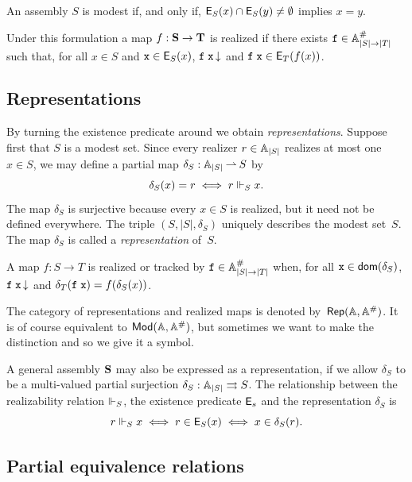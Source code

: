 An assembly $S$ is modest if, and only if, $\mathsf{E}_S(x) \cap \mathsf{E}_S(y)
\neq \emptyset$ implies $x = y$.

Under this formulation a map $f : \mathbf{S} \to \mathbf{T}$ is realized if
there exists $\mathtt{f} \in \mathbb{A}^{\#}_{|S| \to |T|}$ such that, for all $x
\in S$ and $\mathtt{x} \in \mathsf{E}_S(x)$, $\mathtt{f}\;\mathtt{x}\,{\downarrow}$ and
$\mathtt{f}\;\mathtt{x} \in \mathsf{E}_T(f(x))$.

\subsection{Representations}
\label{sec:representations}

By turning the existence predicate around we obtain
\emph{representations}. Suppose first that $S$ is a modest set. Since
every realizer $r \in \mathbb{A}_{|S|}$ realizes at most one $x \in S$, we may
define a partial map $\delta_S : \mathbb{A}_{|S|} \mathbin{\rightharpoonup} S$ by
%
\begin{equation*}
  \delta_S(x) = r \iff r \Vdash_S x.
\end{equation*}
%
The map $\delta_S$ is surjective because every $x \in S$ is realized,
but it need not be defined everywhere. The triple $(S, |S|, \delta_S)$
uniquely describes the modest set~$S$. The map $\delta_S$ is called a
\emph{representation} of~$S$.

A map $f : S \to T$ is realized or tracked by $\mathtt{f} \in \mathbb{A}^{\#}_{|S|
  \to |T|}$ when, for all $\mathtt{x} \in \mathsf{dom}(\delta_S)$,
$\mathtt{f}\;\mathtt{x}\,{\downarrow}$ and $\delta_T(\mathtt{f}\;\mathtt{x}) =
f(\delta_S(x))$.

The category of representations and realized maps is denoted
by~$\mathsf{Rep}(\mathbb{A},\mathbb{A}^{\#})$. It is of course equivalent to $\mathsf{Mod}(\mathbb{A},
  \mathbb{A}^{\#})$, but sometimes we want to make the distinction and so we
give it a symbol.

A general assembly $\mathbf{S}$ may also be expressed as a
representation, if we allow $\delta_S$ to be a multi-valued partial
surjection $\delta_S : \mathbb{A}_{|S|} \rightrightarrows S$. The relationship between
the realizability relation $\Vdash_S$, the existence predicate $\mathsf{E}_s$
and the representation $\delta_S$ is
%
\begin{equation*}
  r \Vdash_S x \iff
  r \in \mathsf{E}_S(x) \iff
  x \in \delta_S(r).
\end{equation*}


\subsection{Partial equivalence relations}
\label{sec:pers}

